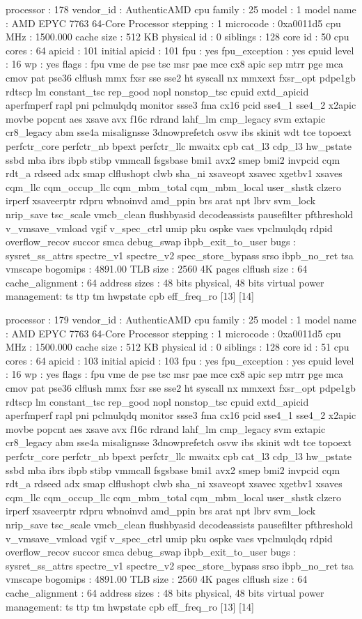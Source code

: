 processor	: 178
vendor_id	: AuthenticAMD
cpu family	: 25
model		: 1
model name	: AMD EPYC 7763 64-Core Processor
stepping	: 1
microcode	: 0xa0011d5
cpu MHz		: 1500.000
cache size	: 512 KB
physical id	: 0
siblings	: 128
core id		: 50
cpu cores	: 64
apicid		: 101
initial apicid	: 101
fpu		: yes
fpu_exception	: yes
cpuid level	: 16
wp		: yes
flags		: fpu vme de pse tsc msr pae mce cx8 apic sep mtrr pge mca cmov pat pse36 clflush mmx fxsr sse sse2 ht syscall nx mmxext fxsr_opt pdpe1gb rdtscp lm constant_tsc rep_good nopl nonstop_tsc cpuid extd_apicid aperfmperf rapl pni pclmulqdq monitor ssse3 fma cx16 pcid sse4_1 sse4_2 x2apic movbe popcnt aes xsave avx f16c rdrand lahf_lm cmp_legacy svm extapic cr8_legacy abm sse4a misalignsse 3dnowprefetch osvw ibs skinit wdt tce topoext perfctr_core perfctr_nb bpext perfctr_llc mwaitx cpb cat_l3 cdp_l3 hw_pstate ssbd mba ibrs ibpb stibp vmmcall fsgsbase bmi1 avx2 smep bmi2 invpcid cqm rdt_a rdseed adx smap clflushopt clwb sha_ni xsaveopt xsavec xgetbv1 xsaves cqm_llc cqm_occup_llc cqm_mbm_total cqm_mbm_local user_shstk clzero irperf xsaveerptr rdpru wbnoinvd amd_ppin brs arat npt lbrv svm_lock nrip_save tsc_scale vmcb_clean flushbyasid decodeassists pausefilter pfthreshold v_vmsave_vmload vgif v_spec_ctrl umip pku ospke vaes vpclmulqdq rdpid overflow_recov succor smca debug_swap ibpb_exit_to_user
bugs		: sysret_ss_attrs spectre_v1 spectre_v2 spec_store_bypass srso ibpb_no_ret tsa vmscape
bogomips	: 4891.00
TLB size	: 2560 4K pages
clflush size	: 64
cache_alignment	: 64
address sizes	: 48 bits physical, 48 bits virtual
power management: ts ttp tm hwpstate cpb eff_freq_ro [13] [14]

processor	: 179
vendor_id	: AuthenticAMD
cpu family	: 25
model		: 1
model name	: AMD EPYC 7763 64-Core Processor
stepping	: 1
microcode	: 0xa0011d5
cpu MHz		: 1500.000
cache size	: 512 KB
physical id	: 0
siblings	: 128
core id		: 51
cpu cores	: 64
apicid		: 103
initial apicid	: 103
fpu		: yes
fpu_exception	: yes
cpuid level	: 16
wp		: yes
flags		: fpu vme de pse tsc msr pae mce cx8 apic sep mtrr pge mca cmov pat pse36 clflush mmx fxsr sse sse2 ht syscall nx mmxext fxsr_opt pdpe1gb rdtscp lm constant_tsc rep_good nopl nonstop_tsc cpuid extd_apicid aperfmperf rapl pni pclmulqdq monitor ssse3 fma cx16 pcid sse4_1 sse4_2 x2apic movbe popcnt aes xsave avx f16c rdrand lahf_lm cmp_legacy svm extapic cr8_legacy abm sse4a misalignsse 3dnowprefetch osvw ibs skinit wdt tce topoext perfctr_core perfctr_nb bpext perfctr_llc mwaitx cpb cat_l3 cdp_l3 hw_pstate ssbd mba ibrs ibpb stibp vmmcall fsgsbase bmi1 avx2 smep bmi2 invpcid cqm rdt_a rdseed adx smap clflushopt clwb sha_ni xsaveopt xsavec xgetbv1 xsaves cqm_llc cqm_occup_llc cqm_mbm_total cqm_mbm_local user_shstk clzero irperf xsaveerptr rdpru wbnoinvd amd_ppin brs arat npt lbrv svm_lock nrip_save tsc_scale vmcb_clean flushbyasid decodeassists pausefilter pfthreshold v_vmsave_vmload vgif v_spec_ctrl umip pku ospke vaes vpclmulqdq rdpid overflow_recov succor smca debug_swap ibpb_exit_to_user
bugs		: sysret_ss_attrs spectre_v1 spectre_v2 spec_store_bypass srso ibpb_no_ret tsa vmscape
bogomips	: 4891.00
TLB size	: 2560 4K pages
clflush size	: 64
cache_alignment	: 64
address sizes	: 48 bits physical, 48 bits virtual
power management: ts ttp tm hwpstate cpb eff_freq_ro [13] [14]

